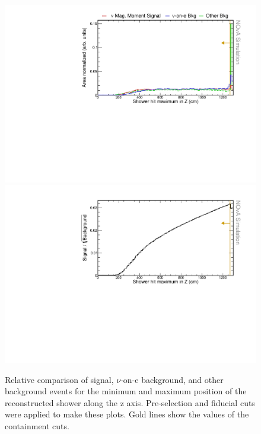 \begin{figure}[hbtp]
\centering
\includegraphics[width=.9\textwidth]{Plots/NuMMEventSelection/N1Cut_maxZ.pdf}
\includegraphics[width=.9\textwidth]{Plots/NuMMEventSelection/NuMM_N1Cut_maxZleft_FOMStats}
\caption{Relative comparison of signal, $\nu$-on-e background, and other background events for the minimum and maximum position of the reconstructed shower along the z axis. Pre-selection and fiducial cuts were applied to make these plots. Gold lines show the values of the containment cuts.}
\label{fig:NuMMContainmentCutMaxZ}
\end{figure}

